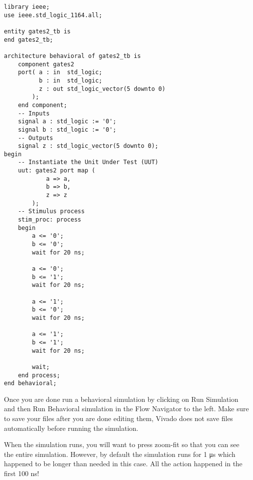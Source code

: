 \noindent
\begin{minipage}{\textwidth}
\begin{verbatim}
library ieee;
use ieee.std_logic_1164.all;

entity gates2_tb is
end gates2_tb;

architecture behavioral of gates2_tb is
    component gates2
    port( a : in  std_logic;
          b : in  std_logic;
          z : out std_logic_vector(5 downto 0)
        );
    end component;
    -- Inputs
    signal a : std_logic := '0';
    signal b : std_logic := '0';
    -- Outputs
    signal z : std_logic_vector(5 downto 0);
begin
    -- Instantiate the Unit Under Test (UUT)
    uut: gates2 port map (
            a => a,
            b => b,
            z => z
        );
    -- Stimulus process
    stim_proc: process
    begin
        a <= '0';
        b <= '0';
        wait for 20 ns;

        a <= '0';
        b <= '1';
        wait for 20 ns;

        a <= '1';
        b <= '0';
        wait for 20 ns;

        a <= '1';
        b <= '1';
        wait for 20 ns;

        wait;
    end process;
end behavioral;
\end{verbatim}
\end{minipage}
\strut

Once you are done run a behavioral simulation by clicking on Run Simulation and then Run
Behavioral simulation in the Flow Navigator to the left.
Make sure to save your files after you are done editing them, Vivado does not save files
automatically before running the simulation.

\begin{center}
\end{center}

When the simulation runs, you will want to press zoom-fit so that you can see the entire
simulation.
However, by default the simulation runs for 1 μs which happened to be longer than needed in
this case.
All the action happened in the first 100 ns!

